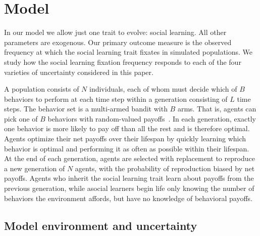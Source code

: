\documentclass[letterpaper,11.5pt]{scrartcl}
\newcommand{\mt}[1]{{\textcolor{myorange} {({\tiny MT:} #1)}}}
\newcommand{\ps}[1]{{\textcolor{mygreen} {({\tiny PS:} #1)}}}
\begin{document}
\section{Model}

In our model we allow just one trait to evolve: social learning. All other parameters are exogenous. Our primary outcome measure is the observed
frequency at which the social learning trait fixates in simulated populations. We study
how the social learning fixation frequency responds to each of the four varieties of
uncertainty considered in this paper. 

A population consists of $N$ individuals, each of whom must decide which of $B$ behaviors to perform at
each time step within a generation consisting of $L$ time steps. The behavior set is a multi-armed bandit with $B$ arms. That is, agents can pick one of $B$ behaviors with random-valued payoffs~\citep{SuttonBartoBook,McElreath2005,Steyvers2009,Rendell2010,Schulz2019}. In each generation, exactly one behavior is more likely to pay off than all the rest and is therefore optimal. Agents optimize their net payoffs over their lifespan by quickly learning which behavior is optimal and performing it as often as possible within their lifespan. At the end of each generation, agents are selected with replacement to reproduce a new generation of $N$ agents, with the probability of reproduction biased by net payoffs. Agents who inherit the social learning trait learn about payoffs from the previous generation, while asocial learners begin life only knowing the number of behaviors the environment affords, but have no knowledge of behavioral payoffs.


\subsection{Model environment and uncertainty}
\end{document}
